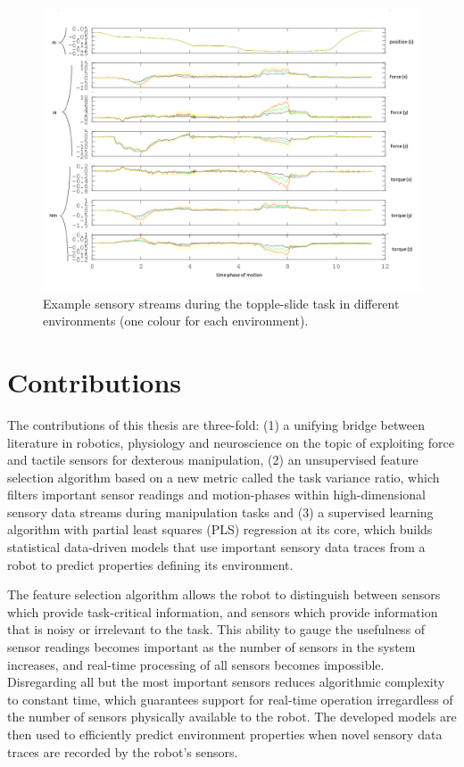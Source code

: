 \begin{figure}[hbt]
	\centering
	\includegraphics[width=\linewidth]{images/eg_sensor_trace}
	\caption{Example sensory streams during the topple-slide task in different environments (one colour for each environment).
}
	\label{fig:eg_sensor_trace}
\end{figure}





\section{Contributions}
The contributions of this thesis are three-fold: 
(1) a unifying bridge between literature in robotics, physiology and neuroscience on the topic of exploiting force and tactile sensors for dexterous manipulation, 
(2) an unsupervised feature selection algorithm based on a new metric called the task variance ratio, which filters important sensor readings and motion-phases within high-dimensional sensory data streams during manipulation tasks and 
(3) a supervised learning algorithm with partial least squares (PLS) regression at its core, which builds statistical data-driven models that use important sensory data traces from a robot to predict properties defining its environment.

The feature selection algorithm allows the robot to distinguish between sensors which provide task-critical information, and sensors which provide information that is noisy or irrelevant to the task.
This ability to gauge the usefulness of sensor readings becomes important as the number of sensors in the system increases, and real-time processing of all sensors becomes impossible.
Disregarding all but the most important sensors reduces algorithmic complexity to constant time, which guarantees support for real-time operation irregardless of the number of sensors physically available to the robot.
The developed models are then used to efficiently predict environment properties when novel sensory data traces are recorded by the robot's sensors.

